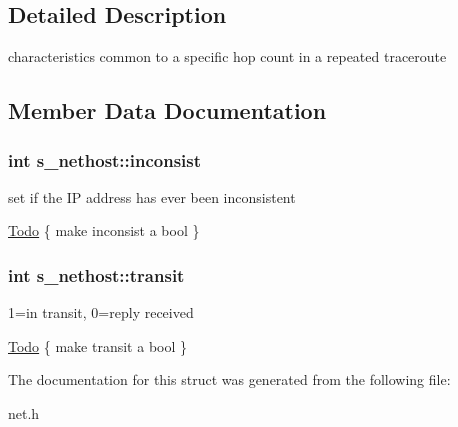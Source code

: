 \subsection{Detailed Description}
characteristics common to a specific hop count in a repeated traceroute 

\subsection{Member Data Documentation}
\hypertarget{structs__nethost_badb6cdfcc0c2350885aa95b47aa7e68}{
\subsubsection[inconsist]{\setlength{\rightskip}{0pt plus 5cm}int {\bf s\_\-nethost::inconsist}}}
\label{structs__nethost_badb6cdfcc0c2350885aa95b47aa7e68}


set if the IP address has ever been inconsistent \begin{Desc}
\item[\hyperlink{todo__todo000002}{Todo}]\{ make inconsist a bool \} \end{Desc}
\hypertarget{structs__nethost_cedbbf6771d0cf034f5a31cccc7e41ec}{
\subsubsection[transit]{\setlength{\rightskip}{0pt plus 5cm}int {\bf s\_\-nethost::transit}}}
\label{structs__nethost_cedbbf6771d0cf034f5a31cccc7e41ec}


1=in transit, 0=reply received \begin{Desc}
\item[\hyperlink{todo__todo000003}{Todo}]\{ make transit a bool \} \end{Desc}


The documentation for this struct was generated from the following file:\begin{CompactItemize}
\item 
net.h\end{CompactItemize}
